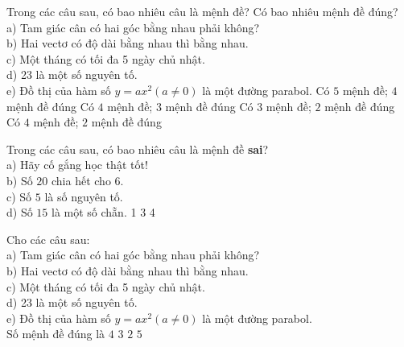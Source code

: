 \begin{ex}%
	Trong các  câu sau, có bao nhiêu câu là mệnh đề? Có bao nhiêu mệnh đề đúng?\\
	 a) Tam giác cân có hai góc bằng nhau phải không?\\
	b) Hai vectơ có độ dài bằng nhau thì bằng nhau.\\ 
	c)  Một tháng có tối đa 5 ngày chủ nhật.\\
	d) 23 là  một số nguyên tố.\\
	e) Đồ thị của hàm số $y=ax^2(a \ne 0)$ là  một đường parabol.
	\choice 
		{Có $5$ mệnh đề; $4$  mệnh đề đúng}
		{\True Có $4$ mệnh đề; $3$ mệnh đề đúng} 
		{Có $3$ mệnh đề; $2$ mệnh  đề đúng}
		{Có $4$ mệnh đề; $2$ mệnh  đề đúng}
\end{ex}

\begin{ex}%
	Trong các câu sau, có  bao nhiêu câu là mệnh đề \textbf{sai}?\\
	a)  Hãy cố gắng học thật tốt!\\
	b) Số $20$  chia hết cho 6.\\
	c) Số $5$ là  số nguyên tố.\\
	d) Số $15$ là  một số chẵn.
	\choice 
		{  1}
		{   }
		 { 3}
		{  4}
\end{ex}

\begin{ex}%
	Cho các câu sau:\\ 
	a) Tam giác  cân có hai góc bằng nhau phải không?\\
	b) Hai vectơ có độ dài bằng nhau thì  bằng nhau.\\
	c) Một tháng có tối đa 5  ngày chủ nhật.\\
	d) 23 là  một số nguyên tố.\\
	e) Đồ thị của hàm số $y=ax^2(a \ne  0)$ là một đường parabol.\\
	 Số mệnh đề đúng là
	\choice 
		 {$4$}
		{\True $3$} 
		 { $2$}
		{ $5$} 
\end{ex}

